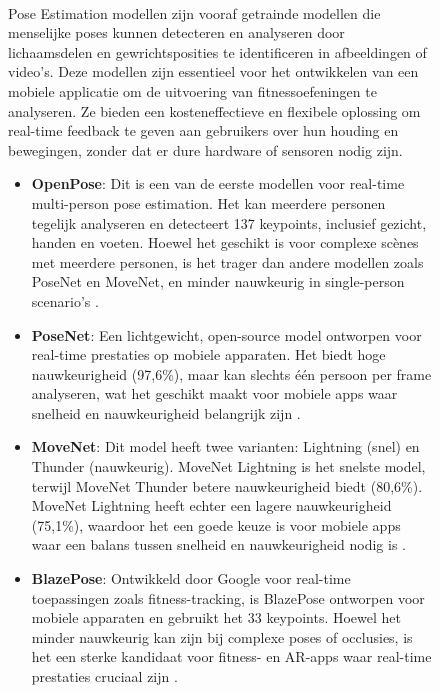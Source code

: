 \begin{figure}[h]
\paragraph{}%
\label{par:pose-estimation-modellen}

Pose Estimation modellen zijn vooraf getrainde modellen die menselijke poses kunnen detecteren en analyseren door lichaamsdelen en gewrichtsposities te identificeren in afbeeldingen of video’s.
Deze modellen zijn essentieel voor het ontwikkelen van een mobiele applicatie om de uitvoering van fitnessoefeningen te analyseren. 
Ze bieden een kosteneffectieve en flexibele oplossing om real-time feedback te geven aan gebruikers over hun houding en bewegingen, zonder dat er dure hardware of sensoren nodig zijn.

\begin{itemize}
    \item \textbf{OpenPose}: Dit is een van de eerste modellen voor real-time multi-person pose estimation. Het kan meerdere personen tegelijk analyseren en detecteert 137 keypoints, inclusief gezicht, handen en voeten. Hoewel het geschikt is voor complexe scènes met meerdere personen, is het trager dan andere modellen zoals PoseNet en MoveNet, en minder nauwkeurig in single-person scenario’s \autocite{BeomjunEtAl2022}.

    \item \textbf{PoseNet}: Een lichtgewicht, open-source model ontworpen voor real-time prestaties op mobiele apparaten. Het biedt hoge nauwkeurigheid (97,6\%), maar kan slechts één persoon per frame analyseren, wat het geschikt maakt voor mobiele apps waar snelheid en nauwkeurigheid belangrijk zijn \autocite{BeomjunEtAl2022}.

    \item \textbf{MoveNet}: Dit model heeft twee varianten: Lightning (snel) en Thunder (nauwkeurig). MoveNet Lightning is het snelste model, terwijl MoveNet Thunder betere nauwkeurigheid biedt (80,6\%). MoveNet Lightning heeft echter een lagere nauwkeurigheid (75,1\%), waardoor het een goede keuze is voor mobiele apps waar een balans tussen snelheid en nauwkeurigheid nodig is \autocite{BeomjunEtAl2022}.

    \item \textbf{BlazePose}: Ontwikkeld door Google voor real-time toepassingen zoals fitness-tracking, is BlazePose ontworpen voor mobiele apparaten en gebruikt het 33 keypoints. Hoewel het minder nauwkeurig kan zijn bij complexe poses of occlusies, is het een sterke kandidaat voor fitness- en AR-apps waar real-time prestaties cruciaal zijn \autocite{PauloEtAl2024}.


\end{itemize}
\end{figure}
